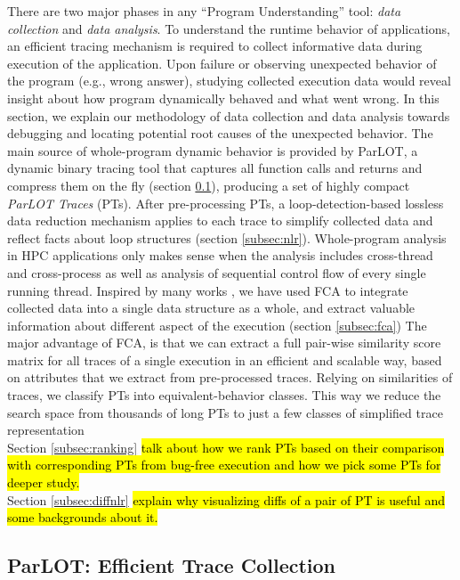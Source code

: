 There are two major phases in any ``Program Understanding'' tool: \textit{data collection} and \textit{data analysis}.
%
To understand the runtime behavior of applications, an efficient tracing mechanism is required to collect informative data during execution of the application.
%
Upon failure or observing unexpected behavior of the program (e.g., wrong answer), studying collected execution data would reveal insight about how program dynamically behaved and what went wrong.
%
In this section, we explain our methodology of data collection and data analysis towards debugging and locating potential root causes of the unexpected behavior.
%
The main source of whole-program dynamic behavior is provided by ParLOT, a dynamic binary tracing tool that captures all function calls and returns and compress them on the fly (section \ref{subsec:parlot}), producing a set of highly compact \textit{ParLOT Traces} (PTs).
%
After pre-processing PTs, a loop-detection-based lossless data reduction mechanism applies to each trace to simplify collected data and reflect facts about loop structures (section \ref{subsec:nlr}).
%
Whole-program analysis in HPC applications only makes sense when the analysis includes cross-thread and cross-process as well as analysis of sequential control flow of every single running thread.
%
Inspired by many works\cite{weberStructural} \cite{Alqadah2011} \cite{Ignatov17}\cite{latticeForDistConst}, we have used FCA\cite{clbook} to integrate collected data into a single data structure as a whole, and extract valuable information about different aspect of the execution (section \ref{subsec:fca})
%
The major advantage of FCA, is that we can extract a full pair-wise similarity score matrix for all traces of a single execution in an efficient and scalable way, based on attributes that we extract from pre-processed traces.
%
Relying on similarities of traces, we classify PTs into equivalent-behavior classes.
%
This way we reduce the search space from thousands of long PTs to just a few classes of simplified trace representation
\\
Section \ref{subsec:ranking} \hl{ talk about how we rank PTs based on their comparison with corresponding PTs from bug-free execution and how we pick some PTs for deeper study.}
\\
Section \ref{subsec:diffnlr}\hl{ explain why visualizing diffs of a pair of PT is useful and some backgrounds about it.}


\subsection{ParLOT: Efficient Trace Collection}
\label{subsec:parlot}


